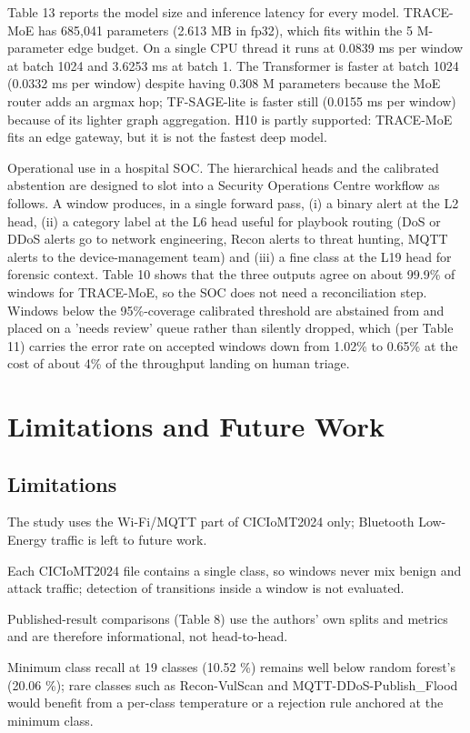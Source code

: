 \documentclass[11pt]{article}
\begin{document}
Table 13 reports the model size and inference latency for every model. TRACE-MoE has 685,041 parameters (2.613 MB in fp32), which fits within the 5 M-parameter edge budget. On a single CPU thread it runs at 0.0839 ms per window at batch 1024 and 3.6253 ms at batch 1. The Transformer is faster at batch 1024 (0.0332 ms per window) despite having 0.308 M parameters because the MoE router adds an argmax hop; TF-SAGE-lite is faster still (0.0155 ms per window) because of its lighter graph aggregation. H10 is partly supported: TRACE-MoE fits an edge gateway, but it is not the fastest deep model.

Operational use in a hospital SOC. The hierarchical heads and the calibrated abstention are designed to slot into a Security Operations Centre workflow as follows. A window produces, in a single forward pass, (i) a binary alert at the L2 head, (ii) a category label at the L6 head useful for playbook routing (DoS or DDoS alerts go to network engineering, Recon alerts to threat hunting, MQTT alerts to the device-management team) and (iii) a fine class at the L19 head for forensic context. Table 10 shows that the three outputs agree on about 99.9\% of windows for TRACE-MoE, so the SOC does not need a reconciliation step. Windows below the 95\%-coverage calibrated threshold are abstained from and placed on a 'needs review' queue rather than silently dropped, which (per Table 11) carries the error rate on accepted windows down from 1.02\% to 0.65\% at the cost of about 4\% of the throughput landing on human triage.

\section{Limitations and Future Work}
\subsection{Limitations}
The study uses the Wi-Fi/MQTT part of CICIoMT2024 only; Bluetooth Low-Energy traffic is left to future work.

Each CICIoMT2024 file contains a single class, so windows never mix benign and attack traffic; detection of transitions inside a window is not evaluated.

Published-result comparisons (Table 8) use the authors' own splits and metrics and are therefore informational, not head-to-head.

Minimum class recall at 19 classes (10.52 \%) remains well below random forest's (20.06 \%); rare classes such as Recon-VulScan and MQTT-DDoS-Publish\_Flood would benefit from a per-class temperature or a rejection rule anchored at the minimum class.
\end{document}
